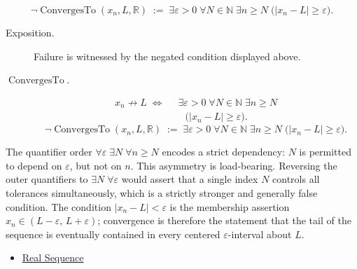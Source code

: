 \begin{remark*}
\[
\neg\operatorname{ConvergesTo}(x_n,L,\mathbb R)
\;:=\;
\exists \varepsilon > 0 \;\forall N \in \mathbb{N} \;\exists n \ge N
\;\bigl(|x_n - L| \ge \varepsilon\bigr).
\]
\end{remark*}
\begin{remark*}
\begin{description}
  \item[Exposition.]
Failure is witnessed by the negated condition displayed above.
  \item[\(\operatorname{ConvergesTo}.\)]
\[
\begin{aligned}
x_n \not\to L
\;\Longleftrightarrow\;
&\;\exists \varepsilon > 0 \;\forall N \in \mathbb{N} \;\exists n \ge N\\
&\quad\bigl(|x_n - L| \ge \varepsilon\bigr).
\end{aligned}
\]
\[
\neg\operatorname{ConvergesTo}(x_n,L,\mathbb R)
\;:=\;
\exists \varepsilon > 0 \;\forall N \in \mathbb{N} \;\exists n \ge N
\;\bigl(|x_n - L| \ge \varepsilon\bigr).
\]
\end{description}
\end{remark*}

\begin{remark*}[Interpretation]
The quantifier order $\forall \varepsilon \;\exists N \;\forall n \ge N$
encodes a strict dependency: $N$ is permitted to depend on $\varepsilon$,
but not on $n$. This asymmetry is load-bearing. Reversing the outer
quantifiers to $\exists N \;\forall \varepsilon$ would assert that a
single index $N$ controls all tolerances simultaneously, which is a
strictly stronger and generally false condition. The condition
$|x_n - L| < \varepsilon$ is the membership assertion $x_n \in (L -
\varepsilon,\, L + \varepsilon)$; convergence is therefore the statement
that the tail of the sequence is eventually contained in every
centered $\varepsilon$-interval about $L$.
\end{remark*}

\begin{dependencies}
\begin{itemize}
  \item \hyperref[def:real-sequence]{Real Sequence}
\end{itemize}
\end{dependencies}

